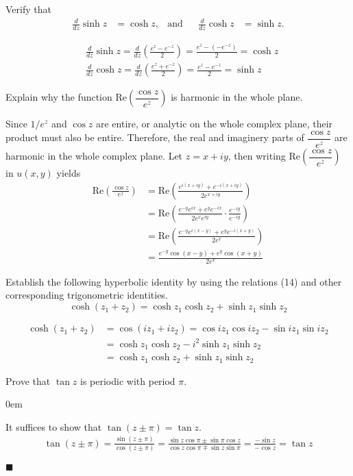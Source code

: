\documentclass[12pt]{article}
\author{Warren Atkison}
\date{\today}
\renewcommand{\qed}{\hfill$\blacksquare$}
\renewenvironment{proof}{\vspace{1em}\begin{addmargin}[2em]{0em}\begin{newproof}}{\end{newproof}\end{addmargin}\qed}
\newenvironment{exercise}[2][Exercise]{\begin{trivlist}
\item[\hskip \labelsep {\bfseries #1} \hskip \labelsep {\bfseries #2.}]}{\end{trivlist}}
\begin{document}
\fancyhf{}
\fancyhead[R]{\today}
\fancyfoot[R]{\thepage}

\begin{exercise}{8}
	Verify that
	\begin{align*}
		\frac{d}{dz}\sinh z &= \cosh z, &\text{and}&& \frac{d}{dz}\cosh z &= \sinh z.
	\end{align*}
\end{exercise}
\begin{align*}
	&\frac{d}{dz} \sinh z = \frac{d}{dz}\left(\frac{e^z - e^{-z}}{2}\right) = \frac{e^z - (-e^{-z})}{2} = \cosh z \\
	&\frac{d}{dz} \cosh z = \frac{d}{dz}\left(\frac{e^z + e^{-z}}{2}\right) = \frac{e^z - e^{-z}}{2} = \sinh z
\end{align*}
\begin{exercise}{11}
	Explain why the function $\text{Re}\left(\dfrac{\cos z}{e^z}\right)$ is harmonic in the whole plane.
\end{exercise}
Since $1/e^z$ and $\cos z$ are entire, or analytic on the whole complex plane, their product must also be entire. Therefore, the real and imaginery parts of $\dfrac{\cos z}{e^z}$ are harmonic in the whole complex plane.
Let $z = x + iy$, then writing Re$\left(\dfrac{\cos z}{e^z}\right)$ in $u(x,y)$ yields
\begin{align*}
	\text{Re}\left(\frac{\cos z}{e^z}\right) &= \text{Re}\left(\frac{e^{i(x + iy)} + e^{-i(x + iy)}}{2e^{x + iy}}\right) \\
						 &= \text{Re}\left(\frac{e^{-y}e^{ix} + e^{y}e^{-ix}}{2e^xe^{iy}} \cdot \frac{e^{-iy}}{e^{-iy}}\right) \\
						 &= \text{Re}\left(\frac{e^{-y}e^{i(x - y)} + e^{y}e^{-i(x + y)}}{2e^x}\right) \\
						 &= \frac{e^{-y}\cos(x - y) + e^{y}\cos(x + y)}{2e^x}
\end{align*}
\begin{exercise}{12c}
	Establish the following hyperbolic identity by using the relations (14) and other corresponding trigonometric identities.
	\[
		\cosh(z_1 + z_2) = \cosh z_1 \cosh z_2 + \sinh z_1 \sinh z_2
	\]
\end{exercise}
\begin{align*}
	\cosh(z_1 + z_2) &= \cos (iz_1 + iz_2) = \cos iz_1 \cos iz_2 - \sin iz_1 \sin iz_2 \\
			 &= \cosh z_1 \cosh z_2 - i^2\sinh z_1 \sinh z_2 \\
			 &= \cosh z_1 \cosh z_2 + \sinh z_1 \sinh z_2
\end{align*}
\begin{exercise}{14b}
	Prove that $\tan z$ is periodic with period $\pi$.
\end{exercise}	
\begin{proof} It suffices to show that $\tan(z \pm \pi) = \tan z$.
	\begin{align*}
		\tan(z \pm \pi) = \frac{\sin(z \pm \pi)}{\cos(z \pm \pi)} = \frac{\sin z \cos \pi \pm \sin \pi \cos z}{\cos z \cos \pi \mp \sin z \sin \pi} = \frac{-\sin z}{-\cos z} = \tan z
	\end{align*}
\end{proof}
\end{document}
